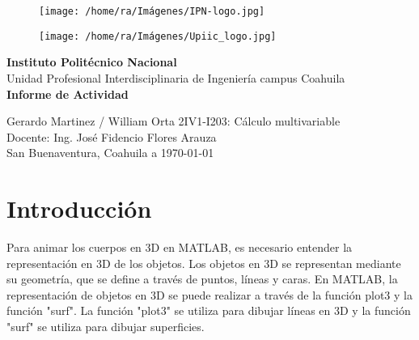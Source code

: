 \documentclass[12pt]{article}
\author{Gerardo Martinez / William Orta}
\date{\today} %
\begin{document}
	\begin{figure}[h!]
		\begin{minipage}[t]{0.32\textwidth}
			\centering
			\texttt{[image: /home/ra/Imágenes/IPN-logo.jpg]}
			\label{fig:imagen1}
		\end{minipage}\hfill
		\begin{minipage}[t]{0.25\textwidth}
			\centering
			\texttt{[image: /home/ra/Imágenes/Upiic\_logo.jpg]}
			\label{fig:imagen2}
		\end{minipage}
	\end{figure}
\begin{center}
	
	\vspace*{1.5cm}
	\LARGE
	\textbf{Instituto Politécnico Nacional}
	\vspace{0.5cm}
	\\Unidad Profesional Interdisciplinaria de Ingeniería campus Coahuila\\
	\vspace{1cm}
	\textbf{Informe de Actividad}\\
	\vspace{0.1cm}
	
Gerardo Martinez / William Orta
	\vfill
	2IV1-I203: Cálculo multivariable\\
	\vspace{0.25cm}
	Docente: Ing. José Fidencio Flores Arauza\\
	\vspace{0.25cm}
	\Large
	San Buenaventura, Coahuila a \today
	
\end{center}
	\begin{minipage}[t]{1.00\textwidth}
		\centering
	\end{minipage}
	\newpage
	\section{Introducción}
	Para animar los cuerpos en 3D en MATLAB, es necesario entender la representación en 3D de los objetos. Los objetos en 3D se representan mediante su geometría, que se define a través de puntos, líneas y caras. En MATLAB, la representación de objetos en 3D se puede realizar a través de la función plot3 y la función "surf". La función "plot3" se utiliza para dibujar líneas en 3D y la función "surf" se utiliza para dibujar superficies.
	
\end{document}
